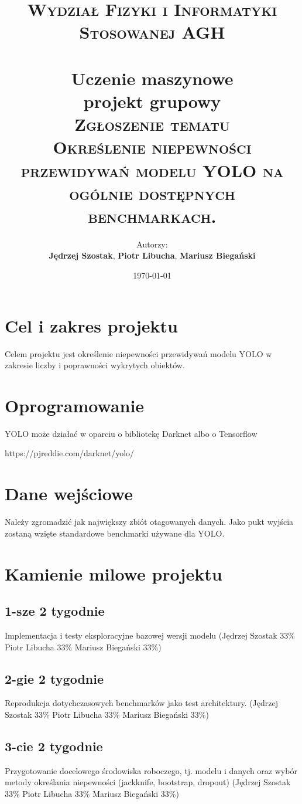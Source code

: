 \documentclass[paper=a4, fontsize=11pt]{scrartcl} %
\title{	
\normalfont \normalsize 
\textsc{Wydział Fizyki i Informatyki Stosowanej AGH} \\ [25pt] %
\horrule{0.5pt} \\[0.4cm] %
\LARGE Uczenie maszynowe \\ projekt grupowy
\\ %
\vspace{5mm}
\textsc{Zgłoszenie tematu}
\horrule{2pt} \\[0.5cm] %
\textsc{Określenie niepewności przewidywań modelu YOLO na ogólnie dostępnych benchmarkach.}
}
\author{	Autorzy: \\
		\textbf{Jędrzej Szostak}, 
		\textbf{Piotr Libucha}, 
		\textbf{Mariusz Biegański}} %
\date{\normalsize\today} %
\numberwithin{equation}{section} %
\numberwithin{figure}{section} %
\numberwithin{table}{section} %
\begin{document}
\maketitle %


\section{Cel i zakres projektu}
    Celem projektu jest określenie niepewności przewidywań modelu YOLO w zakresie liczby i poprawności wykrytych obiektów.
\section{Oprogramowanie}

	YOLO może działać w oparciu o bibliotekę Darknet albo o Tensorflow

 https://pjreddie.com/darknet/yolo/

\section{Dane wejściowe}

	Należy zgromadzić jak największy zbiót otagowanych danych. Jako pukt wyjścia zostaną wzięte standardowe benchmarki używane dla YOLO.
\section{Kamienie milowe projektu}
\subsection{1-sze 2 tygodnie}
    Implementacja i testy eksploracyjne bazowej wersji modelu (Jędrzej Szostak 33\% Piotr Libucha 33\% Mariusz Biegański 33\%)
\subsection{2-gie 2 tygodnie}
    Reprodukcja dotychczasowych benchmarków jako test architektury.
    (Jędrzej Szostak 33\% Piotr Libucha 33\% Mariusz Biegański 33\%)
\subsection{3-cie 2 tygodnie}
    Przygotowanie docelowego środowiska roboczego, tj. modelu i danych oraz wybór metody określania niepewności (jackknife, bootstrap, dropout)
    (Jędrzej Szostak 33\% Piotr Libucha 33\% Mariusz Biegański 33\%)
\end{document}
